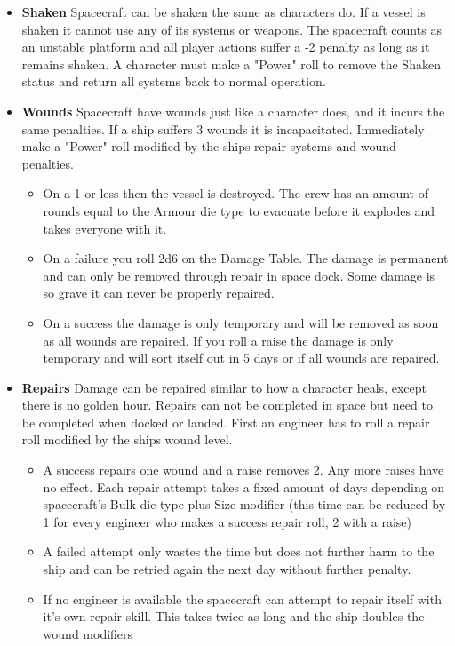 \begin{multicols}{2}
\begin{itemize}
  \item \textbf{Shaken} Spacecraft can be shaken the same as characters do. If a vessel is shaken it cannot use any of its systems or weapons. The spacecraft counts as an unstable platform and all player actions suffer a -2 penalty as long as it remains shaken. A character must make a "Power" roll to remove the Shaken status and return all systems back to normal operation.
  \item \textbf{Wounds} Spacecraft have wounds just like a character does, and it incurs the same penalties. If a ship suffers 3 wounds it is incapacitated. Immediately make a "Power" roll modified by the ships repair systems and wound penalties.
  \begin{itemize}
    \item On a 1 or less then the vessel is destroyed. The crew has an amount of rounds equal to the Armour die type to evacuate before it explodes and takes everyone with it. 
    \item On a failure you roll 2d6 on the Damage Table. The damage is permanent and can only be removed through repair in space dock. Some damage is so grave it can never be properly repaired.
    \item On a success the damage is only temporary and will be removed as soon as all wounds are repaired. If you roll a raise the damage is only temporary and will sort itself out in 5 days or if all wounds are repaired.
  \end{itemize}
  \item \textbf{Repairs} Damage can be repaired similar to how a character heals, except there is no golden hour. Repairs can not be completed in space but need to be completed when docked or landed. First an engineer has to roll a repair roll modified by the ships wound level. 
  \begin{itemize}
    \item A success repairs one wound and a raise removes 2. Any more raises have no effect. Each repair attempt takes a fixed amount of days depending on spacecraft's Bulk die type plus Size modifier (this time can be reduced by 1 for every engineer who makes a success repair roll, 2 with a raise)
    \item A failed attempt only wastes the time but does not further harm to the ship and can be retried again the next day without further penalty.
    \item If no engineer is available the spacecraft can attempt to repair itself with it's own repair skill. This takes twice as long and the ship doubles the wound modifiers

\end{itemize}
\end{itemize}
\end{multicols}
